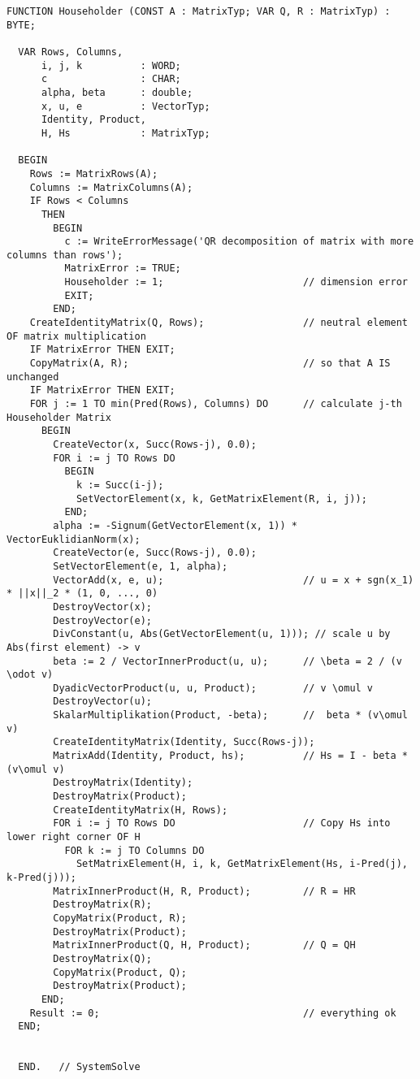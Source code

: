 \begin{lstlisting}[caption=QR-factorisation by Householder]
  FUNCTION Householder (CONST A : MatrixTyp; VAR Q, R : MatrixTyp) : BYTE;

  VAR Rows, Columns,
      i, j, k          : WORD;
      c                : CHAR;
      alpha, beta      : double;
      x, u, e          : VectorTyp;
      Identity, Product,
      H, Hs            : MatrixTyp;

  BEGIN
    Rows := MatrixRows(A);
    Columns := MatrixColumns(A);
    IF Rows < Columns
      THEN
        BEGIN
          c := WriteErrorMessage('QR decomposition of matrix with more columns than rows');
          MatrixError := TRUE;
          Householder := 1;                        // dimension error
          EXIT;
        END;
    CreateIdentityMatrix(Q, Rows);                 // neutral element OF matrix multiplication
    IF MatrixError THEN EXIT;
    CopyMatrix(A, R);                              // so that A IS unchanged
    IF MatrixError THEN EXIT;
    FOR j := 1 TO min(Pred(Rows), Columns) DO      // calculate j-th Householder Matrix
      BEGIN
        CreateVector(x, Succ(Rows-j), 0.0);
        FOR i := j TO Rows DO
          BEGIN
            k := Succ(i-j);
            SetVectorElement(x, k, GetMatrixElement(R, i, j));
          END;
        alpha := -Signum(GetVectorElement(x, 1)) * VectorEuklidianNorm(x);
        CreateVector(e, Succ(Rows-j), 0.0);
        SetVectorElement(e, 1, alpha);
        VectorAdd(x, e, u);                        // u = x + sgn(x_1) * ||x||_2 * (1, 0, ..., 0)
        DestroyVector(x);
        DestroyVector(e);
        DivConstant(u, Abs(GetVectorElement(u, 1))); // scale u by Abs(first element) -> v
        beta := 2 / VectorInnerProduct(u, u);      // \beta = 2 / (v \odot v)
        DyadicVectorProduct(u, u, Product);        // v \omul v
        DestroyVector(u);
        SkalarMultiplikation(Product, -beta);      //  beta * (v\omul v)
        CreateIdentityMatrix(Identity, Succ(Rows-j));
        MatrixAdd(Identity, Product, hs);          // Hs = I - beta * (v\omul v)
        DestroyMatrix(Identity);
        DestroyMatrix(Product);
        CreateIdentityMatrix(H, Rows);
        FOR i := j TO Rows DO                      // Copy Hs into lower right corner OF H
          FOR k := j TO Columns DO
            SetMatrixElement(H, i, k, GetMatrixElement(Hs, i-Pred(j), k-Pred(j)));
        MatrixInnerProduct(H, R, Product);         // R = HR
        DestroyMatrix(R);
        CopyMatrix(Product, R);
        DestroyMatrix(Product);
        MatrixInnerProduct(Q, H, Product);         // Q = QH
        DestroyMatrix(Q);
        CopyMatrix(Product, Q);
        DestroyMatrix(Product);
      END;
    Result := 0;                                   // everything ok
  END;


  END.   // SystemSolve
\end{lstlisting}

